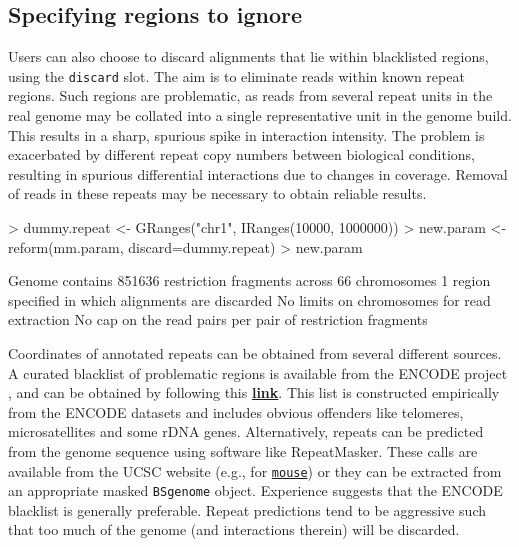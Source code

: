 \documentclass[12pt]{report}
\renewenvironment{Schunk}{\vspace{0pt}}{\vspace{0pt}}
\newcommand{\code}[1]{{\small\texttt{#1}}}
\begin{document}
\subsection{Specifying regions to ignore}
Users can also choose to discard alignments that lie within blacklisted regions, using the \code{discard} slot.
The aim is to eliminate reads within known repeat regions.
Such regions are problematic, as reads from several repeat units in the real genome may be collated into a single representative unit in the genome build.
This results in a sharp, spurious spike in interaction intensity.
The problem is exacerbated by different repeat copy numbers between biological conditions, resulting in spurious differential interactions due to changes in coverage.
Removal of reads in these repeats may be necessary to obtain reliable results.

\begin{Schunk}
\begin{Sinput}
> dummy.repeat <- GRanges("chr1", IRanges(10000, 1000000))
> new.param <- reform(mm.param, discard=dummy.repeat)
> new.param
\end{Sinput}
\begin{Soutput}
Genome contains 851636 restriction fragments across 66 chromosomes
1 region specified in which alignments are discarded
No limits on chromosomes for read extraction
No cap on the read pairs per pair of restriction fragments
\end{Soutput}
\end{Schunk}

Coordinates of annotated repeats can be obtained from several different sources.
A curated blacklist of problematic regions is available from the ENCODE project \citep{dunham2012encode}, and can be obtained by following this \href{https://sites.google.com/site/anshulkundaje/projects/blacklists}{\textbf{link}}.
This list is constructed empirically from the ENCODE datasets and includes obvious offenders like telomeres, microsatellites and some rDNA genes.
Alternatively, repeats can be predicted from the genome sequence using software like RepeatMasker.
These calls are available from the UCSC website (e.g., for \href{hgdownload.soe.ucsc.edu/goldenPath/mm10/bigZips/chromOut.tar.gz}{\texttt{mouse}}) or they can be extracted from an appropriate masked \code{BSgenome} object. 
Experience suggests that the ENCODE blacklist is generally preferable.
Repeat predictions tend to be aggressive such that too much of the genome (and interactions therein) will be discarded.
\end{document}
